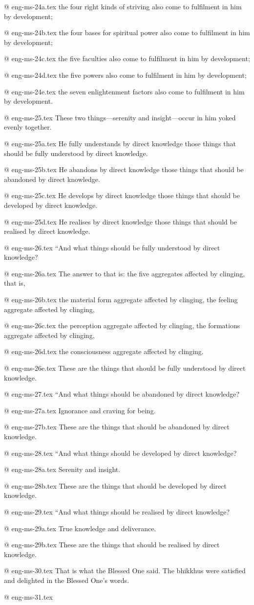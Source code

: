 @ eng-ms-24a.tex
the four right kinds of striving also come to fulfilment in him by development;

@ eng-ms-24b.tex
the four bases for spiritual power also come to fulfilment in him by development;

@ eng-ms-24c.tex
the five faculties also come to fulfilment in him by development;

@ eng-ms-24d.tex
the five powers also come to fulfilment in him by development;

@ eng-ms-24e.tex
the seven enlightenment factors also come to fulfilment in him by development.

@ eng-ms-25.tex
These two things—serenity and insight—occur in him yoked evenly together.

@ eng-ms-25a.tex
He fully understands by direct knowledge those things that should be fully understood by direct knowledge.

@ eng-ms-25b.tex
He abandons by direct knowledge those things that should be abandoned by direct knowledge.

@ eng-ms-25c.tex
He develops by direct knowledge those things that should be developed by direct knowledge.

@ eng-ms-25d.tex
He realises by direct knowledge those things that should be realised by direct knowledge.

@ eng-ms-26.tex
“And what things should be fully understood by direct knowledge?

@ eng-ms-26a.tex
The answer to that is: the five aggregates affected by clinging, that is,

@ eng-ms-26b.tex
the material form aggregate affected by clinging, the feeling aggregate affected by clinging,

@ eng-ms-26c.tex
the perception aggregate affected by clinging, the formations aggregate affected by clinging,

@ eng-ms-26d.tex
the consciousness aggregate affected by clinging.

@ eng-ms-26e.tex
These are the things that should be fully understood by direct knowledge.

@ eng-ms-27.tex
“And what things should be abandoned by direct knowledge?

@ eng-ms-27a.tex
Ignorance and craving for being.

@ eng-ms-27b.tex
These are the things that should be abandoned by direct knowledge.

@ eng-ms-28.tex
“And what things should be developed by direct knowledge?

@ eng-ms-28a.tex
Serenity and insight.

@ eng-ms-28b.tex
These are the things that should be developed by direct knowledge.

@ eng-ms-29.tex
“And what things should be realised by direct knowledge?

@ eng-ms-29a.tex
True knowledge and deliverance.

@ eng-ms-29b.tex
These are the things that should be realised by direct knowledge.

@ eng-ms-30.tex
That is what the Blessed One said. The bhikkhus were satisfied and delighted in the Blessed One’s words.

@ eng-ms-31.tex
